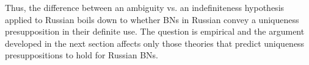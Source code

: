 \documentclass[output=paper,colorlinks,citecolor=brown]{langscibook}
\begin{document}

Thus, the difference between an ambiguity vs. an indefiniteness hypothesis applied to Russian boils down to whether BNs in Russian convey a uniqueness presupposition in their definite use. The question is empirical and the argument developed in the next section affects only those theories that predict uniqueness presuppositions to hold for Russian BNs. 




\end{document}
